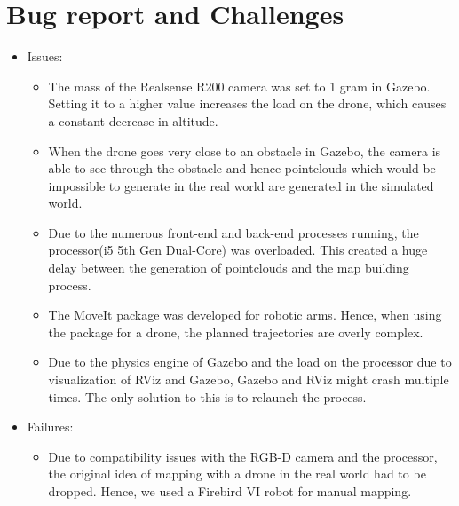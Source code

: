\documentclass[a4paper,12pt,oneside]{book}
\begin{document}
\section{Bug report and Challenges}
\begin{itemize}
	\item Issues:
		\begin{itemize}
			\item The mass of the Realsense R200 camera was set to 1 gram in Gazebo. Setting it to a higher value increases the load on the drone, which causes a constant decrease in altitude.
			\item When the drone goes very close to an obstacle in Gazebo, the camera is able to see through the obstacle and hence pointclouds which would be impossible to generate in the real world are generated in the simulated world.
			\item Due to the numerous front-end and back-end processes running, the processor(i5 5th Gen Dual-Core) was overloaded. This created a huge delay between the generation of pointclouds and the map building process.
			\item The MoveIt package was developed for robotic arms. Hence, when using the package for a drone, the planned trajectories are overly complex.
			
			\item Due to the physics engine of Gazebo and the load on the processor due to visualization of RViz and Gazebo, Gazebo and RViz might crash multiple times. The only solution to this is to relaunch the process.
		\end{itemize}

	\item Failures:
		\begin{itemize}
			\item Due to compatibility issues with the RGB-D camera and the processor, the original idea of mapping with a drone in the real world had to be dropped. Hence, we used a Firebird VI robot for manual mapping.
		\end{itemize}
		

\end{itemize}
\end{document}
